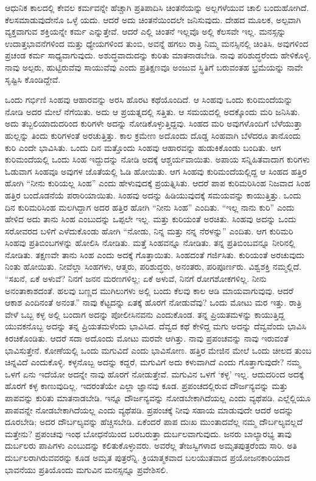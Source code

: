 ಆಧುನಿಕ ಕಾಲದಲ್ಲಿ ಕೇವಲ ಕರ್ಮವನ್ನೇ ಹೆಚ್ಚಾಗಿ ಪ್ರತಿಪಾದಿಸಿ ಚಿಂತನೆಯನ್ನು ಅಲ್ಲಗಳೆಯುವ ಚಾಲಿ ಬಂದುಹೋಗಿದೆ. ಕೆಲಸಮಾಡುವುದೇನೊ ಒಳ್ಳೆ ಯದು. ಆದರೆ ಅದು ಚಿಂತನೆಯಿಂದಲೇ ಜನಿಸುವುದು. ದೇಹದ ಮೂಲಕ, ಅಲ್ಪವಾಗಿ ವ್ಯಕ್ತವಾಗುವ ಶಕ್ತಿಯನ್ನೇ ಕರ್ಮ ಎನ್ನುತ್ತೇವೆ. ಆದರೆ ಎಲ್ಲಿ ಚಿಂತನೆ ಇಲ್ಲವೊ ಅಲ್ಲಿ ಕೆಲಸವೇ ಇಲ್ಲ. ಮನಸ್ಸನ್ನು ಉದಾತ್ತಭಾವನೆಗಳಿಂದ ಮತ್ತು ಧ್ಯೇಯಗಳಿಂದ ತುಂಬಿ, ಅವನ್ನೆ ಹಗಲು ರಾತ್ರಿ ನಿಮ್ಮ ಮನಸ್ಸಿನಲ್ಲಿ ಚಿಂತಿಸಿ. ಅವುಗಳಿಂದ ಪ್ರಚಂಡ ಕರ್ಮ ಸಾಧ್ಯವಾಗುವುದು. ಅಶುದ್ಧವಾದುದನ್ನು ಕುರಿತು ಮಾತನಾಡಬೇಡಿ. ನಾವು ಪರಿಶುದ್ಧರೆಂದು ಹೇಳಿಕೊಳ್ಳಿ. ನಾವು ಅಲ್ಪರು, ಹುಟ್ಟಿರುವೆವು ಸಾಯುವೆವು ಎಂದು ಪ್ರತಿಕ್ಷಣವೂ ಅಂಜುವ ಸ್ಥಿತಿಗೆ ಬರುವಂತಹ ಭ್ರಮೆಯನ್ನು ನಾವೇ ಸೃಷ್ಟಿಸಿ ಕೊಂಡಿದ್ದೇವೆ.

ಒಂದು ಗರ್ಭಿಣಿ ಸಿಂಹವು ಆಹಾರವನ್ನು ಅರಸಿ ಹೊರಟ ಕಥೆಯೊಂದಿದೆ. ಆ ಸಿಂಹವು ಒಂದು ಕುರಿಮಂದೆಯನ್ನು ನೋಡಿ ಅದರ ಮೇಲೆ ನೆಗೆಯಿತು. ಅದು ಆ ಪ್ರಯತ್ನದಲ್ಲಿ ಸತ್ತಿತು. ಆ ಸಮಯದಲ್ಲಿ ಅದಕ್ಕೊಂದು ಮರಿ ಜನಿಸಿತು. ಅದು ತಬ್ಬಲಿಯಾದುದರಿಂದ ಕುರಿಗಳೇ ಅದನ್ನು ನೋಡಿಕೊಳ್ಳುತ್ತಿದ್ದವು. ಸಿಂಹದ ಮರಿ ಅವುಗಳೊಂದಿಗೆ ಬೆಳೆಯುತ್ತಾ ಹುಲ್ಲನ್ನು ತಿಂದು ಕುರಿಗಳಂತೆ ಅರಚುತ್ತಿತ್ತು. ಕಾಲ ಕ್ರಮೇಣ ಅದೊಂದು ದೊಡ್ಡ ಸಿಂಹವಾಗಿ ಬೆಳೆದರೂ ತಾನೊಂದು ಕುರಿ ಎಂದೇ ಭಾವಿಸಿತು. ಒಂದು ದಿನ ಮತ್ತೊಂದು ಸಿಂಹವು ಆಹಾರವನ್ನು ಹುಡುಕಿಕೊಂಡು ಬಂದಿತು. ಆಗ ಕುರಿಮಂದೆಯಲ್ಲಿ ಒಂದು ಸಿಂಹ ಇದ್ದುದನ್ನು ನೋಡಿ ಅದಕ್ಕೆ ಆಶ್ಚರ್ಯವಾಯಿತು. ಅಪಾಯ ಸನ್ನಿಹಿತವಾದಾಗ ಕುರಿಗಳು ಓಡುವಾಗ ಸಿಂಹವೂ ಅವುಗಳ ಜೊತೆಯಲ್ಲಿ ಓಡಿ ಹೋಯಿತು. ಆಗ ಸಿಂಹವು ಕುರಿಮಂದೆಯಲ್ಲಿದ್ದ ಆ ಸಿಂಹದ ಹತ್ತಿರ ಹೋಗಿ “ನೀನು ಕುರಿಯಲ್ಲ ಸಿಂಹ” ಎಂದು ಹೇಳುವುದಕ್ಕೆ ಪ್ರಯತ್ನಿಸಿತು. ಆದರೆ ಪಾಪ ಕುರಿಮರಿಸಿಂಹ ನಿಜವಾದ ಸಿಂಹ ಹತ್ತಿರ ಬಂದೊಡನೆಯೆ ಪರಾರಿಯಾಯಿತು. ಸಿಂಹವು ಅದನ್ನು ಹಿಡಿಯುವುದಕ್ಕೆ ಸಮಯವನ್ನು ಕಾಯುತ್ತಿತ್ತು. ಒಂದು ದಿನ ಕುರಿಮರಿಸಿಂಹ ಮಲಗಿದ್ದಾಗ ಅದರ ಹತ್ತಿರ ಹೋಗಿ “ನೀನು ಸಿಂಹ” ಎಂದಿತು. “ಇಲ್ಲ ನಾನು ಕುರಿ” ಎಂದು ಹೇಳಿದ ಅದು ತಾನು ಸಿಂಹ ಎಂಬುದನ್ನು ಒಪ್ಪಲೇ ಇಲ್ಲ. ಮತ್ತು ಕುರಿಯಂತೆ ಅರಚಿತು. ಸಿಂಹವು ಅದನ್ನು ಒಂದು ಸರೋವರದ ಬಳಿಗೆ ಎಳೆದುಕೊಂಡು ಹೋಗಿ “ನೋಡು, ನಿನ್ನ ಮತ್ತು ನನ್ನ ನೆರಳನ್ನು” ಎಂದಿತು. ಆಗ ಕುರಿಮರಿ ಸಿಂಹವು ಪ್ರತಿಬಿಂಬಗಳನ್ನು ಹೋಲಿಸಿ ನೋಡಿತು. ಮತ್ತೆ ಸಿಂಹವನ್ನೂ ನೋಡಿತು. ತನ್ನ ಪ್ರತಿಬಿಂಬವನ್ನೂ ನೀರಿನಲ್ಲಿ ನೋಡಿತು. ತಕ್ಷಣವೇ ತಾನು ಸಿಂಹ ಎಂದು ಅದಕ್ಕೆ ಗೊತ್ತಾಯಿತು. ಸಿಂಹದಂತೆ ಗರ್ಜಿಸಿತು. ಕುರಿಯಂತೆ ಅರಚುವುದು ನಿಂತು ಹೋಯಿತು. ನೀವೆಲ್ಲಾ ಸಿಂಹಗಳು, ಆತ್ಮರು, ಪರಿಶುದ್ಧರು, ಅನಂತರು, ಪರಿಪೂರ್ಣರು. ವಿಶ್ವಶಕ್ತಿ ನಮ್ಮಲ್ಲಿದೆ. “ಸಖನೆ, ಏಕೆ ಅಳುವೆ? ನಿನಗೆ ಜನನ ಮರಣಗಳಿಲ್ಲ; ಏಕೆ ಅಳುವೆ, ನಿನಗೆ ರೋಗಶೋಕಗಳಿಲ್ಲ. ನೀನು ಅನಂತಾಕಾಶದಂತೆ. ಹಲವು ಬಣ್ಣದ ಮುಗಿಲುಗಳು ಅಲ್ಲಿ ಬಂದು ಕೆಲವು ಕಾಲ ಆಡಿ ಮಾಯವಾಗುವುವು. ಆದರೆ ಆಕಾಶ ಎಂದಿನಂತೆ ಅನಂತ.” ನಾವು ಕೆಟ್ಟದನ್ನು ಏತಕ್ಕೆ ಹೊರಗೆ ನೋಡುವೆವು? ಒಂದು ಮೋಟು ಮರ ಇತ್ತು. ರಾತ್ರಿ ವೇಳೆ ಒಬ್ಬ ಕಳ್ಳ ಅಲ್ಲಿ ಬಂದಾಗ ಅದನ್ನು ಪೋಲೀಸಿನವನು ಎಂದುಕೊಂಡ. ತನ್ನ ಪ್ರಿಯತಮಳನ್ನು ಕಾಯುತ್ತಿದ್ದ ಯುವಕನೊಬ್ಬ ಅದನ್ನು ತನ್ನ ಪ್ರಿಯತಮಳೆಂದು ಭಾವಿಸಿದ. ದೆವ್ವದ ಕಥೆ ಕೇಳಿದ್ದ ಮಗು ಅದನ್ನು ದೆವ್ವವೆಂದು ಭಾವಿಸಿ ಕಿರಚಿಕೊಂಡಿತು. ಆದರೆ ಸದಾ ಅದೊಂದು ಮೋಟು ಮರವೇ ಆಗಿತ್ತು. ನಾವು ಪ್ರಪಂಚವನ್ನು ನಾವು ಇರುವಂತೆ ಭಾವಿಸುತ್ತೇನೆ. ಕೋಣೆಯಲ್ಲಿ ಒಂದು ಮಗುವಿದೆ ಎಂದು ಭಾವಿಸೋಣ. ಹತ್ತಿರ ಮೇಜಿನ ಮೇಲೆ ಒಂದು ಚೀಲದ ತುಂಬ ಚಿನ್ನವಿದೆ ಎಂದುಕೊಳ್ಳಿ. ಕಳ್ಳನೊಬ್ಬ ಅದನ್ನು ಕದ್ದರೆ, ಮಗುವಿಗೆ ಅದು ಕಳುವಾಗಿದೆ ಎಂದು ಗೊತ್ತಾಗುವುದೇ? ನಮ್ಮ ಒಳಗೆ ಏನು ಇದೆಯೋ ಅದನ್ನೇ ನಾವು ಹೊರಗೆ ನೋಡುತ್ತೇವೆ. ಮಗುವಿನ ಒಳಗೆ ‘ಕಳ್ಳ’ ಇಲ್ಲ. ಆದುದರಿಂದ ಅದಕ್ಕೆ ಹೊರಗೆ ಕಳ್ಳ ಕಾಣುವುದಿಲ್ಲ. ಇದರಂತೆಯೇ ಎಲ್ಲಾ ಜ್ಞಾನವು ಕೂಡ. ಪ್ರಪಂಚದಲ್ಲಿರುವ ದೌರ್ಜನ್ಯವನ್ನು ಮತ್ತು ಪಾಪವನ್ನು ಕುರಿತು ಮಾತನಾಡಬೇಡಿ. ಇನ್ನೂ ದೌರ್ಜನ್ಯವನ್ನು ನೋಡಬೇಕಾಗಿದೆಯಲ್ಲ ಎಂದು ವ್ಯಥೆಪಡಿ. ಎಲ್ಲೆಲ್ಲಿಯೂ ಪಾಪವನ್ನೇ ನೋಡಬೇಕಾಗಿದೆಯಲ್ಲ ಎಂದು ವ್ಯಥೆಪಡಿ. ಪ್ರಪಂಚಕ್ಕೆ ನೀವು ಸಹಾಯ ಮಾಡುವುದೇ ಆದರೆ ಅದನ್ನು ದೂರಬೇಡಿ; ಅದರ ದೌರ್ಬಲ್ಯವನ್ನು ಹೆಚ್ಚಿಸಬೇಡಿ. ಏಕೆಂದರೆ ಪಾಪ ದುಃಖ ಮುಂತಾದವೆಲ್ಲ ನಮ್ಮ ದೌರ್ಬಲ್ಯವಲ್ಲದೆ ಮತ್ತೇನು? ಪ್ರಪಂಚವು ಇಂಥ ಬೋಧನೆಯಿಂದ ಬರಬರುತ್ತಾ ದುರ್ಬಲವಾಗುವುದು. ಜನರು ಬಾಲ್ಯಾರಭ್ಯ ತಾವು ದುರ್ಬಲರು ಪಾಪಿಗಳು ಎಂಬುದನ್ನು ಕಲಿತುಕೊಳ್ಳುವರು. ಅವರೆಲ್ಲ ತೇಜಸ್ವಿಗಳಾದ ಅಮೃತಪುತ್ರರೆಂದು ಸಾರಿ. ಅತಿ ದುರ್ಬಲರಾಗಿರುವವರನ್ನು ಕೂಡ ಅಮೃತ ಪುತ್ರರೆನ್ನಿ. ಕ್ರಿಯಾತ್ಮಕವಾದ ಬಲಯುತವಾದ ಪ್ರಯೋಜನಕಾರಿಯಾದ ಭಾವನೆಯು ಪ್ರತಿಯೊಂದು ಮಗುವಿನ ಮನಸ್ಸನ್ನೂ ಪ್ರವೇಶಿಸಲಿ. 